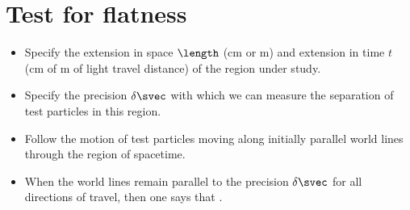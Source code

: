 \section{Test for flatness}
%
\begin{itemize}
  \item Specify the extension in space $\length$ (\si{cm} or \si{m}) and extension in time $t$ (\si{cm} of \si{m} of light travel distance) of the region under study.
  \item Specify the precision $\delta\svec$ with which we can measure the separation of test particles in this region.
  \item Follow the motion of test particles moving along initially parallel world lines through the region of spacetime.
  \item When the world lines remain parallel to the precision $\delta\svec$ for all directions of travel, then one says that .
\end{itemize}






